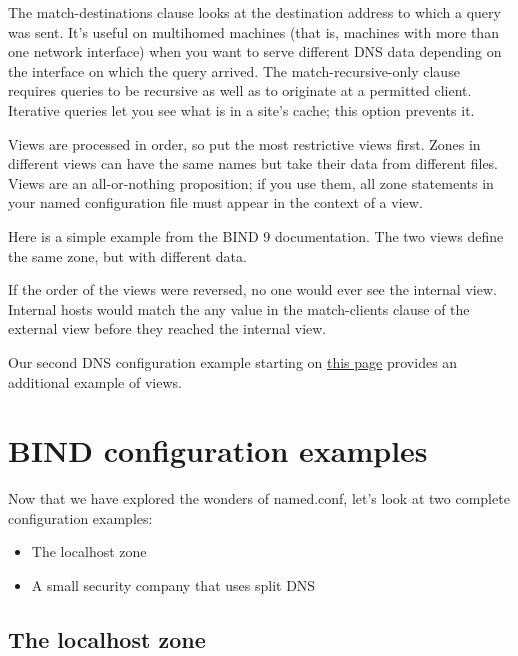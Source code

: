 The {match-destinations} clause looks at the destination address to
which a query was sent. It's useful on multihomed machines (that is,
machines with more than one network interface) when you want to serve
different DNS data depending on the interface on which the query
arrived. The {match-recursive-only} clause requires queries to be
recursive as well as to originate at a permitted client. Iterative
queries let you see what is in a site's cache; this option prevents it.

Views are processed in order, so put the most restrictive views first.
Zones in different views can have the same names but take their data
from different files. Views are an all-or-nothing proposition; if you
use them, all {zone} statements in your {named} configuration file must
appear in the context of a {view}.

Here is a simple example from the BIND 9 documentation. The two views
define the same zone, but with different data.


If the order of the views were reversed, no one would ever see the
internal view. Internal hosts would match the {any} value in the
{match-clients} clause of the external view before they reached the
internal view.

Our second DNS configuration example starting on
\protect\hyperlink{part0024_split_049.htmlux5cux23_idTextAnchor925}{this
page} provides an additional example of views.




\section{BIND configuration examples}

\protect\hypertarget{part0024_split_047.htmlux5cux23_idIndexMarker2214}{}{}Now
that we have explored the wonders of {named.conf}, let's look at two
complete configuration examples:

\begin{itemize}
\tightlist
\item
  The localhost zone
\item
  A small security company that uses split DNS
\end{itemize}

\protect\hypertarget{part0024_split_048.html}{}{}

\hypertarget{part0024_split_048.htmlux5cux23_idContainer1069}{}
\hypertarget{part0024_split_048.htmlux5cux23calibre_pb_47}{%
\subsection[The localhost
zone]{\texorpdfstring{\protect\hypertarget{part0024_split_048.htmlux5cux23_idTextAnchor923}{}{}\protect\hypertarget{part0024_split_048.htmlux5cux23_idIndexMarker2215}{}{}\protect\hypertarget{part0024_split_048.htmlux5cux23_idIndexMarker2216}{}{}\protect\hypertarget{part0024_split_048.htmlux5cux23_idTextAnchor924}{}{}The
localhost
zone}{The localhost zone}}\label{part0024_split_048.htmlux5cux23calibre_pb_47}}

